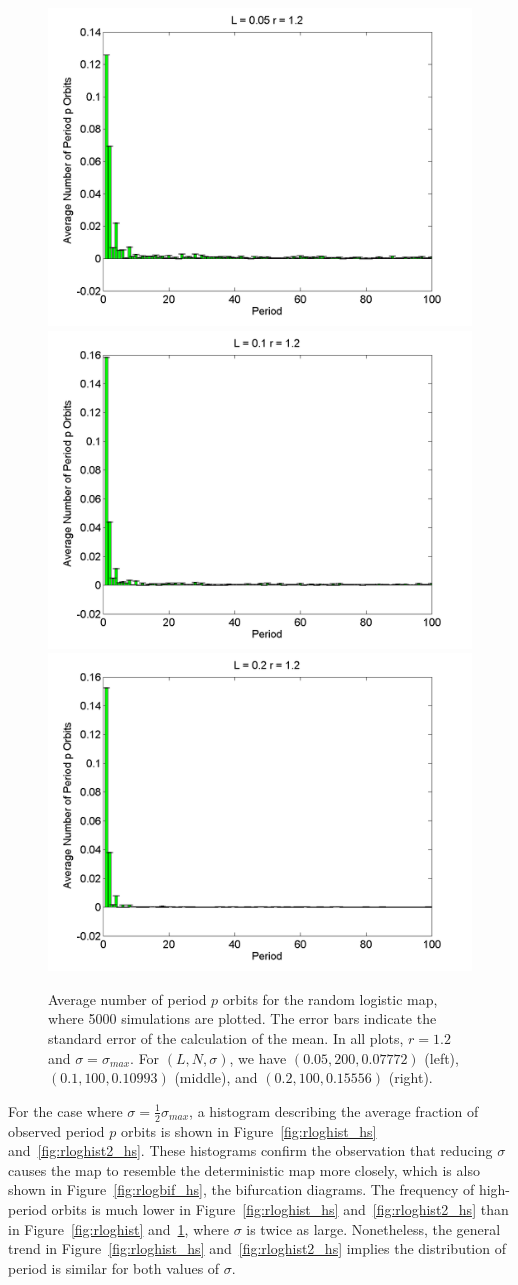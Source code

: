\begin{figure}[H]\linespread{1}
\caption[Average number of period $p$ orbits for the random logistic
map, $\sigma=\sigma_{max}$ and $r=1.2$]{Average number of period $p$ orbits for the random logistic
map, where 5000 simulations are plotted. The error bars indicate
the standard error of the calculation of the mean. In all plots,
$r=1.2$ and $\sigma=\sigma_{max}$. For $(L,N,\sigma)$,
we have $(0.05, 200, 0.07772)$ (left), $(0.1, 100, 0.10993)$
(middle), and $(0.2, 100, 0.15556)$ (right).}\label{fig:rloghist2}
	\begin{center}	\includegraphics[width=.33\textwidth]{figs/rlog_hist_L_005_r_12_s_007772_a_000015098_sims_5000.png}\hfill
\includegraphics[width=.33\textwidth]{figs/rlog_hist_L_01_r_12_s_010993_a_000060373_sims_5000.png}\hfill	
\includegraphics[width=.33\textwidth]{figs/rlog_hist_L_02_r_12_s_015556_a_00024119_sims_5000.png}
	\end{center}
\end{figure}

For the case where $\sigma = \frac{1}{2}\sigma_{max}$, a histogram describing the average fraction of observed period $p$
orbits is shown in Figure~\ref{fig:rloghist_hs}
and~\ref{fig:rloghist2_hs}. These histograms confirm the observation
that reducing $\sigma$ causes the map to resemble the deterministic
map more closely, which is also shown in Figure~\ref{fig:rlogbif_hs},
the bifurcation diagrams. The frequency of high-period orbits is much
lower in Figure~\ref{fig:rloghist_hs} and~\ref{fig:rloghist2_hs} than
in Figure~\ref{fig:rloghist} and~\ref{fig:rloghist2}, where
$\sigma$ is twice as large. Nonetheless, the general trend in Figure~\ref{fig:rloghist_hs}
and~\ref{fig:rloghist2_hs} implies the distribution of period is
similar for both values of $\sigma$.

